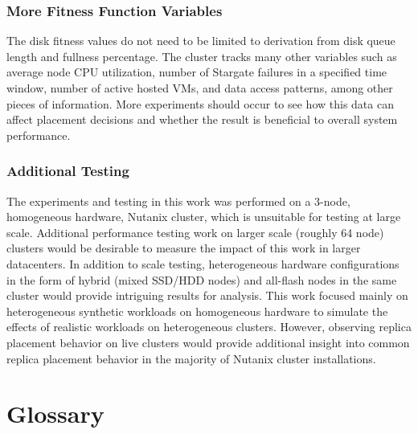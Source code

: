 \documentclass[12pt]{article}
\begin{document}
    \subsubsection{More Fitness Function Variables}

    The disk fitness values do not need to be limited to derivation from disk
    queue length and fullness percentage. The cluster tracks many other variables
    such as average node CPU utilization, number of Stargate failures in a
    specified time window, number of active hosted VMs, and data access
    patterns, among other pieces of information. More experiments should occur
    to see how this data can affect placement decisions and whether the result
    is beneficial to overall system performance.
    
    \subsubsection{Additional Testing}

    The experiments and testing in this work was performed on a 3-node,
    homogeneous hardware, Nutanix cluster, which is unsuitable for testing at
    large scale. Additional performance testing work on larger scale (roughly 64 node)
    clusters would be desirable to measure the impact of this work in larger
    datacenters. In addition to scale testing, heterogeneous hardware
    configurations in the form of hybrid (mixed SSD/HDD nodes) and all-flash
    nodes in the same cluster would provide intriguing results for analysis.
    This work focused mainly on heterogeneous synthetic workloads on
    homogeneous hardware to simulate the effects of realistic workloads on
    heterogeneous clusters. However, observing replica placement behavior on
    live clusters would provide additional insight into common replica
    placement behavior in the majority of Nutanix cluster installations.


\newpage
\null
\section*{Glossary}
\thispagestyle{empty}
\end{document}
